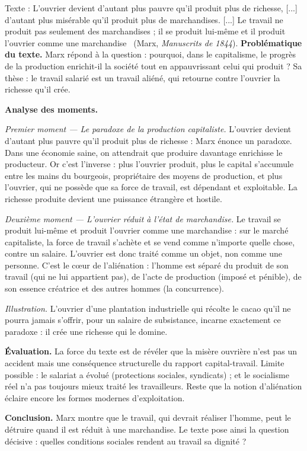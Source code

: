 \documentclass[11pt]{article}
\newcommand{\cle}[1]{{\popxbold\color{popdark}#1}}
\begin{document}
\begin{exoresolu}
Texte : \guillemotleft L'ouvrier devient d'autant plus pauvre qu'il produit plus de richesse, [...] d'autant plus misérable qu'il produit plus de marchandises. [...] Le travail ne produit pas seulement des marchandises ; il se produit lui-même et il produit l'ouvrier comme une marchandise \guillemotright\ (Marx, \emph{Manuscrits de 1844}).
\tcblower
\textbf{Problématique du texte.} Marx répond à la question : pourquoi, dans le capitalisme, le progrès de la production enrichit-il la société tout en appauvrissant celui qui produit ? Sa thèse : le travail salarié est un travail \cle{aliéné}, qui retourne contre l'ouvrier la richesse qu'il crée.

\textbf{Analyse des moments.}

\emph{Premier moment — Le paradoxe de la production capitaliste.} \guillemotleft L'ouvrier devient d'autant plus pauvre qu'il produit plus de richesse \guillemotright : Marx énonce un paradoxe. Dans une économie saine, on attendrait que produire davantage enrichisse le producteur. Or c'est l'inverse : plus l'ouvrier produit, plus le capital s'accumule entre les mains du \cle{bourgeois}, propriétaire des moyens de production, et plus l'ouvrier, qui ne possède que sa force de travail, est dépendant et exploitable. La richesse produite devient une puissance étrangère et hostile.

\emph{Deuxième moment — L'ouvrier réduit à l'état de marchandise.} \guillemotleft Le travail se produit lui-même et produit l'ouvrier comme une marchandise \guillemotright : sur le marché capitaliste, la force de travail s'achète et se vend comme n'importe quelle chose, contre un \cle{salaire}. L'ouvrier est donc traité comme un objet, non comme une personne. C'est le cœur de l'\cle{aliénation} : l'homme est séparé du produit de son travail (qui ne lui appartient pas), de l'acte de production (imposé et pénible), de son essence créatrice et des autres hommes (la concurrence).

\emph{Illustration.} L'ouvrier d'une plantation industrielle qui récolte le cacao qu'il ne pourra jamais s'offrir, pour un salaire de subsistance, incarne exactement ce paradoxe : il crée une richesse qui le domine.

\textbf{Évaluation.} La force du texte est de révéler que la misère ouvrière n'est pas un accident mais une conséquence structurelle du rapport capital-travail. Limite possible : le salariat a évolué (protections sociales, syndicats) ; et le socialisme réel n'a pas toujours mieux traité les travailleurs. Reste que la notion d'aliénation éclaire encore les formes modernes d'exploitation.

\textbf{Conclusion.} Marx montre que le travail, qui devrait réaliser l'homme, peut le détruire quand il est réduit à une marchandise. Le texte pose ainsi la question décisive : quelles conditions sociales rendent au travail sa dignité ?
\end{exoresolu}
\end{document}
